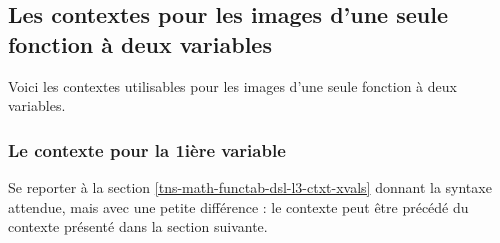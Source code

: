 \documentclass[12pt, a4paper]{article}
\begin{document}

\subsection{Les contextes pour les images d'une seule fonction à deux variables}

Voici les contextes utilisables pour les images d'une seule fonction à deux variables.

\medskip

\begin{itemize*}[before = \leavevmode\kern15pt, itemjoin = \kern15pt]
	\item {}

	\item {}

	\item {}
\end{itemize*}




\subsubsection{Le contexte  pour la 1ière variable}

Se reporter à la section \ref{tns-math-functab-dsl-l3-ctxt-xvals} donnant la syntaxe attendue, mais avec une petite différence : le contexte  peut être précédé du contexte  présenté dans la section suivante.
\end{document}
